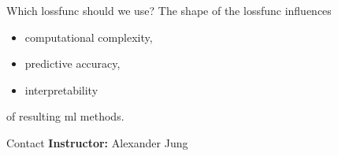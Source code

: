 \documentclass[12pt]{beamer}
\begin{document}
\begin{frame}{Which \Gls{lossfunc} should we use?}
The shape of the \gls{lossfunc} influences  \\[2mm]
\begin{itemize} 
	\item computational complexity,  \\[4mm]
	\item predictive accuracy,   \\[4mm]
	\item interpretability  \\[3mm]
\end{itemize} 
of resulting \gls{ml} methods. 
\end{frame}
	
	

	\begin{frame}{Contact}
		\small
		\textbf{Instructor:} Alexander Jung \\
	\end{frame}
	
\end{document}
